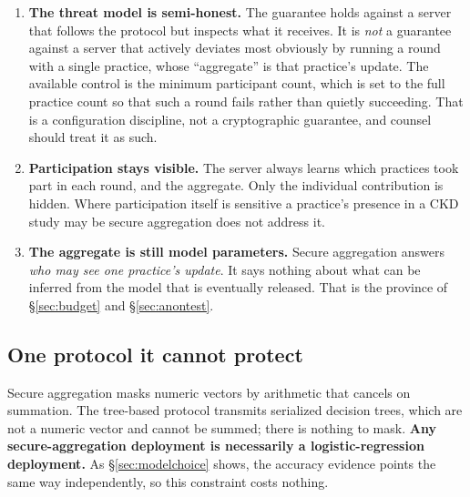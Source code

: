 \begin{enumerate}
  \item \textbf{The threat model is semi-honest.} The guarantee holds against a server that follows
        the protocol but inspects what it receives. It is \emph{not} a guarantee against a server
        that actively deviates most obviously by running a round with a single practice, whose
        ``aggregate'' is that practice's update. The available control is the minimum participant
        count, which is set to the full practice count so that such a round fails rather than
        quietly succeeding. That is a configuration discipline, not a cryptographic guarantee, and
        counsel should treat it as such.
  \item \textbf{Participation stays visible.} The server always learns which practices took part in
        each round, and the aggregate. Only the individual contribution is hidden. Where
        participation itself is sensitive a practice's presence in a CKD study may be secure
        aggregation does not address it.
  \item \textbf{The aggregate is still model parameters.} Secure aggregation answers \emph{who may
        see one practice's update}. It says nothing about what can be inferred from the model that
        is eventually released. That is the province of \S\ref{sec:budget} and \S\ref{sec:anontest}.
\end{enumerate}

\subsection{One protocol it cannot protect}

Secure aggregation masks numeric vectors by arithmetic that cancels on summation. The tree-based
protocol transmits serialized decision trees, which are not a numeric vector and cannot be summed;
there is nothing to mask. \textbf{Any secure-aggregation deployment is necessarily a
logistic-regression deployment.} As \S\ref{sec:modelchoice} shows, the accuracy evidence points the
same way independently, so this constraint costs nothing.
